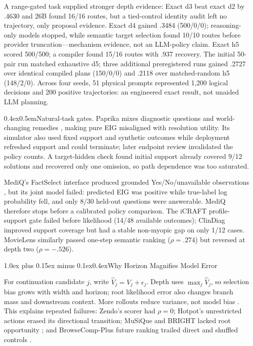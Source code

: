 \documentclass[10pt]{article}
\makeatletter
\renewcommand\section{\@startsection{section}{1}{0pt}%
  {1.0ex plus 0.15ex minus 0.1ex}{0.4ex}{\normalfont\Large\bfseries}}
\renewcommand\paragraph{\@startsection{paragraph}{4}{0pt}%
  {0.4ex}{0.5em}{\normalfont\normalsize\bfseries}}
\makeatother
\begin{document}
A range-gated task supplied stronger depth evidence: Exact d3 beat exact d2 by
.4630 and 26B found 16/16 routes, but a tied-control identity audit left no
trajectory, only proposal evidence. Exact d4 gained .3484 (500/0/0);
reasoning-only models stopped, while semantic target selection found 10/10
routes before provider truncation---mechanism evidence, not an LLM-policy claim.
Exact h5 scored 500/500; a compiler found 15/16 routes with .937 recovery. The
initial 50-pair run matched exhaustive d5; three additional preregistered runs
gained .2727 over identical compiled plans (150/0/0) and .2118 over
matched-random h5 (148/2/0). Across four seeds, 51 physical prompts represented
1,200 logical decisions and 200 positive trajectories: an engineered exact
result, not unaided LLM planning.

\paragraph{Natural-task gates.}
Paprika mixes diagnostic questions and world-changing remedies
\citep{tajwar2025curious}, making pure EIG misaligned with resolution utility.
Its simulator also used fixed support and synthetic outcomes while deployment
refreshed support and could terminate; later endpoint review invalidated the
policy counts. A target-hidden check found initial support already covered 9/12
solutions and recovered only one omission, so path dependence was too saturated.

MediQ's FactSelect interface produced grounded Yes/No/unavailable observations
\citep{li2024mediq}, but its joint model failed: predicted EIG was positive while
true-label log probability fell, and only 8/30 held-out questions were
answerable. MediQ therefore stops before a calibrated policy comparison. The
iCRAFT profile-support gate failed before likelihood (14/48 available outcomes);
ClinDiag improved support coverage but had a stable non-myopic gap on only 1/12
cases. MovieLens similarly passed one-step semantic ranking
($\rho=.274$) but reversed at depth two ($\rho=-.526$).

\section{Why Horizon Magnifies Model Error}

For continuation candidate $j$, write
$\widehat V_j=V_j+\epsilon_j$. Depth uses $\max_j\widehat V_j$, so selection
bias grows with width and horizon; root likelihood error also changes branch
mass and downstream context. More rollouts reduce variance, not model bias
\citep{catanach2023misspecification}. This explains repeated failures:
Zendo's scorer had $\rho=0$; Hotpot's unrestricted actions erased its directional
transition; MuSiQue and BRIGHT lacked root opportunity
\citep{trivedi2022musique,su2025bright}; and BrowseComp-Plus future ranking
trailed direct and shuffled controls \citep{chen2026browsecompplus}.
\end{document}
